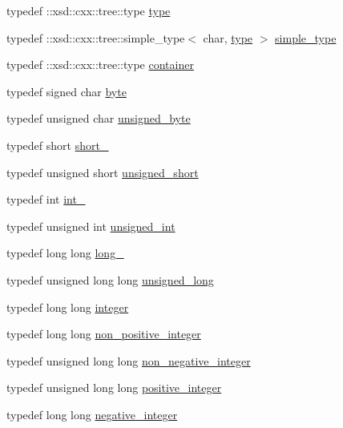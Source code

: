 \begin{DoxyCompactItemize}
\item 
typedef \+::xsd\+::cxx\+::tree\+::type \hyperlink{namespacexml__schema_a4bf7f144ce936a6a393de26f4cb707f0}{type}
\item 
typedef \+::xsd\+::cxx\+::tree\+::simple\+\_\+type$<$ char, \hyperlink{namespacexml__schema_a4bf7f144ce936a6a393de26f4cb707f0}{type} $>$ \hyperlink{namespacexml__schema_a2ee8a034145ffa154d46910b41892495}{simple\+\_\+type}
\item 
typedef \+::xsd\+::cxx\+::tree\+::type \hyperlink{namespacexml__schema_ada9aa30dc722e93ee2ed7243085402a5}{container}
\item 
typedef signed char \hyperlink{namespacexml__schema_a2a462724b41fb68016d13b34f9a84b7d}{byte}
\item 
typedef unsigned char \hyperlink{namespacexml__schema_a876b68656d976c6343512f3d44fe8ca2}{unsigned\+\_\+byte}
\item 
typedef short \hyperlink{namespacexml__schema_a705720c1fed1575ccdcfd21cb7ab39ab}{short\+\_\+}
\item 
typedef unsigned short \hyperlink{namespacexml__schema_a7fc7b4a846c512c370346e15dfdcecaa}{unsigned\+\_\+short}
\item 
typedef int \hyperlink{namespacexml__schema_acfa24ac68e1a188e7f44c36f7a158bf4}{int\+\_\+}
\item 
typedef unsigned int \hyperlink{namespacexml__schema_a85ca3205d8af287e149aac54535f57e7}{unsigned\+\_\+int}
\item 
typedef long long \hyperlink{namespacexml__schema_a1d78aacee49e26cb7a69d5aa97df1268}{long\+\_\+}
\item 
typedef unsigned long long \hyperlink{namespacexml__schema_a4413fbcf4c65ffc7aaafe465d72fcb33}{unsigned\+\_\+long}
\item 
typedef long long \hyperlink{namespacexml__schema_aaaea7c8ce4dfbe26cc52c91c29c97b7c}{integer}
\item 
typedef long long \hyperlink{namespacexml__schema_a3de6073e510eb8edd71ddc6e0256e2f9}{non\+\_\+positive\+\_\+integer}
\item 
typedef unsigned long long \hyperlink{namespacexml__schema_af42ef5911d65f41a0a03598b056f05aa}{non\+\_\+negative\+\_\+integer}
\item 
typedef unsigned long long \hyperlink{namespacexml__schema_abe9d639a15a121d2868ae2f9c974ca24}{positive\+\_\+integer}
\item 
typedef long long \hyperlink{namespacexml__schema_acf9528a84381d07f2802785c947bf441}{negative\+\_\+integer}

\end{DoxyCompactItemize}
